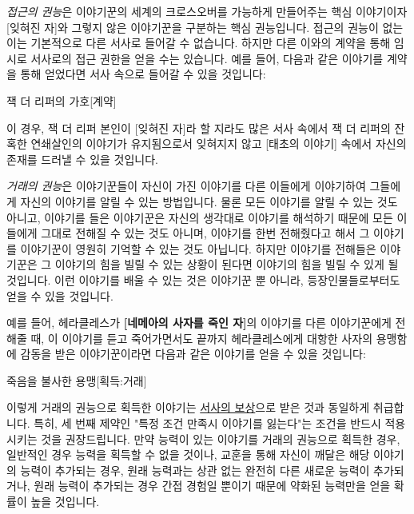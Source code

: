 \documentclass{report}
\begin{document}
	\emph{접근의 권능}은 이야기꾼의 세계의 크로스오버를 가능하게 만들어주는 핵심 이야기이자 [잊혀진 자]와 그렇지 않은 이야기꾼을 구분하는 핵심 권능입니다. 접근의 권능이 없는 이는 기본적으로 다른 서사로 들어갈 수 없습니다. 하지만 다른 이와의 계약을 통해 임시로 서사로의 접근 권한을 얻을 수는 있습니다. 예를 들어, 다음과 같은 이야기를 계약을 통해 얻었다면 서사 속으로 들어갈 수 있을 것입니다:
	
	\begin{story}{잭 더 리퍼의 가호}{[계약]}
	\end{story}
	
	이 경우, 잭 더 리퍼 본인이 [잊혀진 자]라 할 지라도 많은 서사 속에서 잭 더 리퍼의 잔혹한 연쇄살인의 이야기가 유지됨으로서 잊혀지지 않고 [태초의 이야기] 속에서 자신의 존재를 드러낼 수 있을 것입니다.
	
	\smallskip
	
	\emph{거래의 권능}은 이야기꾼들이 자신이 가진 이야기를 다른 이들에게 이야기하여 그들에게 자신의 이야기를 알릴 수 있는 방법입니다. 물론 모든 이야기를 알릴 수 있는 것도 아니고, 이야기를 들은 이야기꾼은 자신의 생각대로 이야기를 해석하기 때문에 모든 이들에게 그대로 전해질 수 있는 것도 아니며, 이야기를 한번 전해줬다고 해서 그 이야기를 이야기꾼이 영원히 기억할 수 있는 것도 아닙니다. 하지만 이야기를 전해들은 이야기꾼은 그 이야기의 힘을 빌릴 수 있는 상황이 된다면 이야기의 힘을 빌릴 수 있게 될 것입니다. 이런 이야기를 배울 수 있는 것은 이야기꾼 뿐 아니라, 등장인물들로부터도 얻을 수 있을 것입니다.
	
	예를 들어, 헤라클레스가 \textbf{[네메아의 사자를 죽인 자]}의 이야기를 다른 이야기꾼에게 전해줄 때, 이 이야기를 듣고 죽어가면서도 끝까지 헤라클레스에게 대항한 사자의 용맹함에 감동을 받은 이야기꾼이라면 다음과 같은 이야기를 얻을 수 있을 것입니다:
	
	\begin{story}{죽음을 불사한 용맹}{[획득:거래]}
		
	\end{story}
	
	이렇게 거래의 권능으로 획득한 이야기는 \hyperlink{reward}{서사의 보상}으로 받은 것과 동일하게 취급합니다. 특히, 세 번째 제약인 "특정 조건 만족시 이야기를 잃는다"는 조건을 반드시 적용시키는 것을 권장드립니다. 만약 능력이 있는 이야기를 거래의 권능으로 획득한 경우, 일반적인 경우 능력을 획득할 수 없을 것이나, 교훈을 통해 자신이 깨달은 해당 이야기의 능력이 추가되는 경우, 원래 능력과는 상관 없는 완전히 다른 새로운 능력이 추가되거나, 원래 능력이 추가되는 경우 간접 경험일 뿐이기 때문에 약화된 능력만을 얻을 확률이 높을 것입니다.
	
\end{document}
